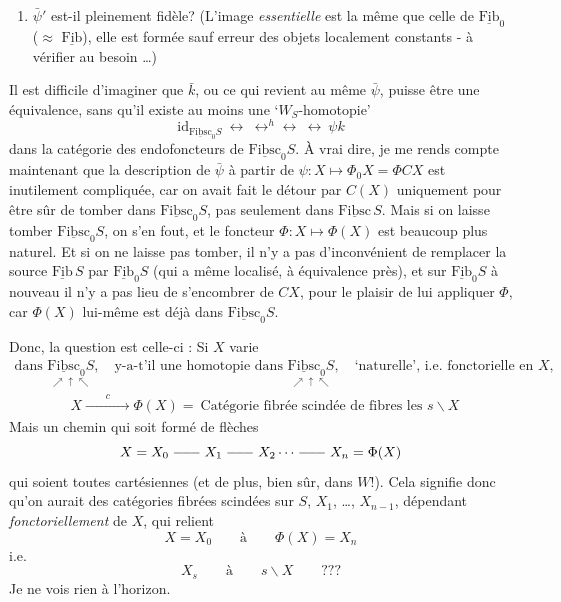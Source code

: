 \documentclass[11pt]{article}
\newcommand{\printedpage}[1]{\marginpar{\footnotesize p.~#1}}
\newcommand{\msp}[1]{\marginpar{\footnotesize [#1]}}
\newcommand{\uu}[1]{\underline{\mathrm{#1}}}
\newcommand{\lline}{\mathrel{\relbar\joinrel\relbar\joinrel\relbar}}
\begin{document}
\begin{enumerate}[leftmargin=*]
\item[$3^o$)] $\bar{\psi}'$ est-il pleinement fidèle? (L'image \textit{essentielle} est la même que celle de $\uu{Fib}_0$ ($\approx$ $\uu{Fib}$), elle est formée sauf erreur des objets localement constants - à vérifier au besoin \dots)
\end{enumerate}

\printedpage{23}

\msp{page 39}
Il est difficile d'imaginer que $\bar{k}$, ou ce qui revient au même $\bar{\psi}$, puisse être une équivalence, sans qu'il existe au moins une `$W_S$-homotopie'
\[
\mathrm{id}_{\uu{Fibsc}_0 S} \ \leftrightarrow\ \leftrightarrow^{h}\!\leftrightarrow\ \leftrightarrow\ \psi k
\]
dans la catégorie des endofoncteurs de $\uu{Fibsc}_0 S$. À vrai dire, je me rends compte maintenant que la description de $\bar{\psi}$ à partir de $\psi : X \longmapsto \Phi_0 X = \Phi C X$ est inutilement compliquée, car on avait fait le détour par $C(X)$ uniquement pour être sûr de tomber dans $\uu{Fibsc}_0 S$, pas seulement dans $\uu{Fibsc}\, S$. Mais si on laisse tomber $\uu{Fibsc}_0 S$, on s'en fout, et le foncteur $\Phi : X \longmapsto \Phi(X)$ est beaucoup plus naturel. Et si on ne laisse pas tomber, il n'y a pas d'inconvénient de remplacer la source $\uu{Fib}\, S$ par $\uu{Fib}_0 S$ (qui a même localisé, à équivalence près), et sur $\uu{Fib}_0 S$ à nouveau il n'y a pas lieu de s'encombrer de $CX$, pour le plaisir de lui appliquer $\Phi$, car $\Phi(X)$ lui-même est déjà dans $\uu{Fibsc}_0 S$.

Donc, la question est celle-ci : Si $X$ varie
\msp{page 40}
\[
\begin{array}{l}
\text{dans } \underset{\nearrow\uparrow\nwarrow}{\uu{Fibsc}_0 S}, \quad \text{y-a-t'il une homotopie dans } \underset{\nearrow\uparrow\nwarrow}{\uu{Fibsc}_0 S}, \quad \text{`naturelle', i.e. fonctorielle en } X, \\[2ex]
\qquad\qquad X \xrightarrow{\qquad c \qquad} \Phi(X) = \ \text{Catégorie fibrée scindée de fibres les } s\backslash X
\end{array}
\]
Mais un chemin qui soit formé de flèches
\[
X = X_0 \lline X_1 \lline X_2 \cdots \lline X_n = \Phi(X)
\]
qui soient toutes cartésiennes (et de plus, bien sûr, dans $W$!). Cela signifie donc qu'on aurait des catégories fibrées scindées sur $S$, $X_1$, \dots, $X_{n-1}$, dépendant \textit{fonctoriellement} de $X$, qui relient
\[
X = X_0 \qquad \text{à} \qquad \Phi(X) = X_n
\]
i.e.
\[
X_s \qquad \text{à} \qquad s\backslash X \qquad \text{???}
\]
Je ne vois rien à l'horizon.
\end{document}
